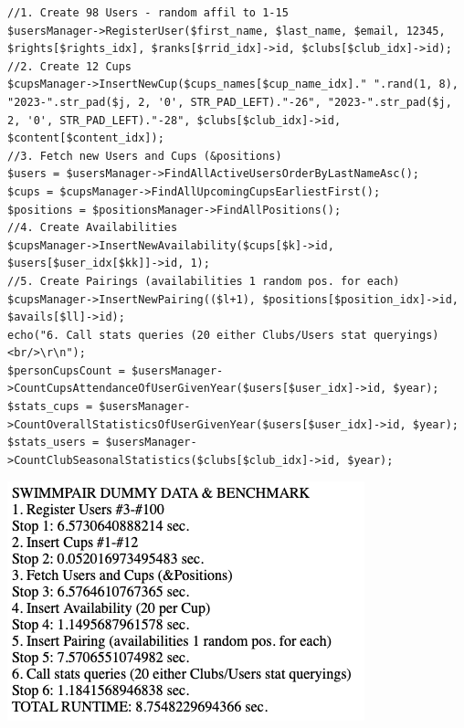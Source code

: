 \begin{lstlisting}
//1. Create 98 Users - random affil to 1-15
$usersManager->RegisterUser($first_name, $last_name, $email, 12345, $rights[$rights_idx], $ranks[$rrid_idx]->id, $clubs[$club_idx]->id);
//2. Create 12 Cups
$cupsManager->InsertNewCup($cups_names[$cup_name_idx]." ".rand(1, 8), "2023-".str_pad($j, 2, '0', STR_PAD_LEFT)."-26", "2023-".str_pad($j, 2, '0', STR_PAD_LEFT)."-28", $clubs[$club_idx]->id, $content[$content_idx]);
//3. Fetch new Users and Cups (&positions)
$users = $usersManager->FindAllActiveUsersOrderByLastNameAsc();
$cups = $cupsManager->FindAllUpcomingCupsEarliestFirst();
$positions = $positionsManager->FindAllPositions();
//4. Create Availabilities
$cupsManager->InsertNewAvailability($cups[$k]->id, $users[$user_idx[$kk]]->id, 1);
//5. Create Pairings (availabilities 1 random pos. for each)
$cupsManager->InsertNewPairing(($l+1), $positions[$position_idx]->id, $avails[$ll]->id);
echo("6. Call stats queries (20 either Clubs/Users stat queryings)<br/>\r\n");
$personCupsCount = $usersManager->CountCupsAttendanceOfUserGivenYear($users[$user_idx]->id, $year);
$stats_cups = $usersManager->CountOverallStatisticsOfUserGivenYear($users[$user_idx]->id, $year);
$stats_users = $usersManager->CountClubSeasonalStatistics($clubs[$club_idx]->id, $year);

\end{lstlisting}
\includegraphics[scale=0.707]{img/app-benchmarking.png}

